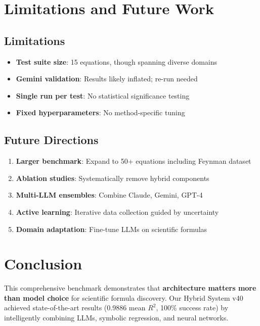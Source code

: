 \documentclass[11pt,a4paper]{article}
\begin{document}
\section{Limitations and Future Work}

\subsection{Limitations}

\begin{itemize}
    \item \textbf{Test suite size}: 15 equations, though spanning diverse domains
    \item \textbf{Gemini validation}: Results likely inflated; re-run needed
    \item \textbf{Single run per test}: No statistical significance testing
    \item \textbf{Fixed hyperparameters}: No method-specific tuning
\end{itemize}

\subsection{Future Directions}

\begin{enumerate}
    \item \textbf{Larger benchmark}: Expand to 50+ equations including Feynman dataset
    \item \textbf{Ablation studies}: Systematically remove hybrid components
    \item \textbf{Multi-LLM ensembles}: Combine Claude, Gemini, GPT-4
    \item \textbf{Active learning}: Iterative data collection guided by uncertainty
    \item \textbf{Domain adaptation}: Fine-tune LLMs on scientific formulas
\end{enumerate}

\section{Conclusion}

This comprehensive benchmark demonstrates that \textbf{architecture matters more than model choice} for scientific formula discovery. Our Hybrid System v40 achieved state-of-the-art results (0.9886 mean $R^2$, 100\% success rate) by intelligently combining LLMs, symbolic regression, and neural networks.
\end{document}
